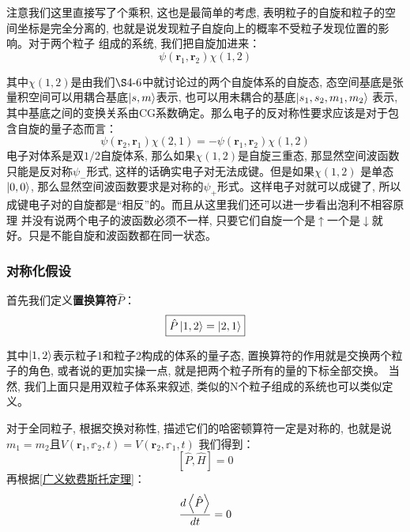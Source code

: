 \documentclass[a4paper,zihao=-4,linespread=1]{ctexrep}
\begin{document}
    注意我们这里直接写了个乘积, 这也是最简单的考虑, 表明粒子的自旋和粒子的空间坐标是完全分离的, 也就是说发现粒子自旋向上的概率不受粒子发现位置的影响。对于两个粒子
    组成的系统, 我们把自旋加进来：
    \begin{equation}
        \psi(\mathbf{r}_1,\mathbf{r}_2)\chi(1,2)
    \end{equation}

    其中$\chi(1,2)$是由我们$\S4\mbox{-}6$中就讨论过的两个自旋体系的自旋态, 态空间基底是张量积空间可以用耦合基底$\ket{s,m}$表示, 也可以用未耦合的基底$\ket{s_1,s_2,m_1,m_2}$
    表示, 其中基底之间的变换关系由CG系数确定。那么电子的反对称性要求应该是对于包含自旋的量子态而言：
    \begin{equation}
        \psi(\mathbf{r}_2,\mathbf{r}_1)\chi(2,1)=-\psi(\mathbf{r}_1,\mathbf{r}_2)\chi(1,2)
    \end{equation}
    电子对体系是双$1/2$自旋体系, 那么如果$\chi(1,2)$是自旋三重态, 那显然空间波函数只能是反对称$\psi_-$形式, 这样的话确实电子对无法成键。但是如果$\chi(1,2)$
    是单态$\ket{0,0}$, 那么显然空间波函数要求是对称的$\psi_+$形式。这样电子对就可以成键了, 所以成键电子对的自旋都是“相反”的。而且从这里我们还可以进一步看出泡利不相容原理
    并没有说两个电子的波函数必须不一样, 只要它们自旋一个是$\uparrow$一个是$\downarrow$就好。只是不能自旋和波函数都在同一状态。
    \subsubsection*{对称化假设}
    首先我们定义\textbf{置换算符}$\hat{P}$：
    \begin{equation}
        \boxed{
            \hat{P}\ket{1,2}=\ket{2,1}
        }
    \end{equation}

    其中$\ket{1,2}$表示粒子1和粒子2构成的体系的量子态, 置换算符的作用就是交换两个粒子的角色, 或者说的更加实操一点, 就是把两个粒子所有的量的下标全部交换。
    当然, 我们上面只是用双粒子体系来叙述, 类似的N个粒子组成的系统也可以类似定义。
    
    对于全同粒子, 根据交换对称性, 描述它们的哈密顿算符一定是对称的, 也就是说$m_1=m_2$且$V(\mathbf{r}_1,\mathbb{r}_2,t)=V(\mathbf{r}_2,\mathbb{r}_1,t)$
    我们得到：
    \begin{equation}
        \label{eq:5.18}
        \left[\hat{P},\hat{H}\right]=0
    \end{equation}
    再根据\ref{广义欸费斯托定理}：
    \begin{equation}
        \frac{d\Braket{\hat{P}}}{dt}=0
    \end{equation}
    
\end{document}
